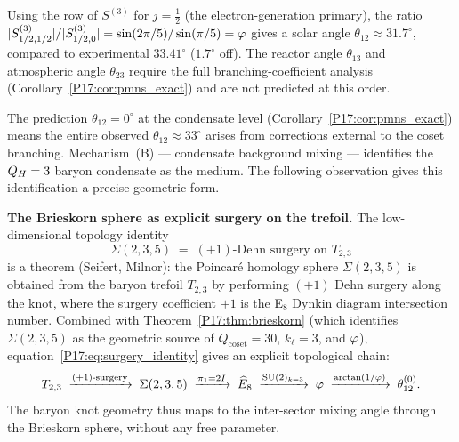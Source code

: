 \begin{remark}
\label{P17:rem:Smat_phi}
Using the row of $S^{(3)}$ for $j=\tfrac12$ (the electron-generation
primary), the ratio $|S^{(3)}_{1/2,1/2}|/|S^{(3)}_{1/2,0}|
=\sin(2\pi/5)/\sin(\pi/5)=\varphi$ gives a solar angle
$\theta_{12}\approx31.7^\circ$, compared to experimental
$33.41^\circ$ ($1.7^\circ$ off). The reactor angle $\theta_{13}$ and
atmospheric angle $\theta_{23}$ require the full branching-coefficient
analysis (Corollary~\ref{P17:cor:pmns_exact}) and are not predicted at
this order.
\end{remark}

\begin{remark}
\label{P17:rem:solar_angle}
The prediction $\theta_{12}=0^\circ$ at the condensate level
(Corollary~\ref{P17:cor:pmns_exact}) means the entire observed
$\theta_{12}\approx33^\circ$ arises from corrections external to the
coset branching.  Mechanism~(B) --- condensate background mixing ---
identifies the $Q_H=3$ baryon condensate as the medium.  The following
observation gives this identification a precise geometric form.

\textbf{The Brieskorn sphere as explicit surgery on the trefoil.}
The low-dimensional topology identity
\begin{equation}
  \Sigma(2,3,5) \;=\; (+1)\text{-Dehn surgery on }T_{2,3}
  \label{P17:eq:surgery_identity}
\end{equation}
is a theorem (Seifert, Milnor): the Poincar\'e homology sphere
$\Sigma(2,3,5)$ is obtained from the baryon trefoil $T_{2,3}$
by performing $(+1)$ Dehn surgery along the knot, where the surgery
coefficient $+1$ is the E$_8$ Dynkin diagram intersection number.
Combined with Theorem~\ref{P17:thm:brieskorn} (which identifies
$\Sigma(2,3,5)$ as the geometric source of $Q_{\mathrm{coset}}=30$,
$k_\ell=3$, and $\varphi$), equation~\eqref{P17:eq:surgery_identity} gives an
explicit topological chain:
\[
  T_{2,3}
  \;\xrightarrow{(+1)\text{-surgery}}\;
  \Sigma(2,3,5)
  \;\xrightarrow{\pi_1=2I}\;
  \widehat{E}_8
  \;\xrightarrow{\mathrm{SU}(2)_{k=3}}\;
  \varphi
  \;\xrightarrow{\arctan(1/\varphi)}\;
  \theta_{12}^{(0)}.
\]
The baryon knot geometry thus maps to the inter-sector mixing angle
through the Brieskorn sphere, without any free parameter.


\end{remark}
